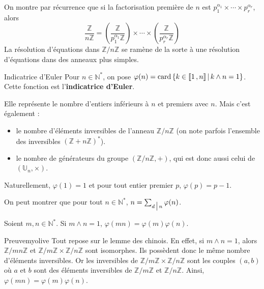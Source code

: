     On montre par récurrence que si la factorisation première de $n$ est $p_1^{\alpha_1} \times \cdots \times p_r^{\alpha_r}$, alors 
    \[ \frac{\mathbb{Z}}{n \mathbb{Z}} = \left(\frac{\mathbb{Z}}{p_1^{\alpha_1} \mathbb{Z}}\right) \times \cdots \times \left(\frac{\mathbb{Z}}{p_r^{\alpha_r} \mathbb{Z}}\right) \]   
    La résolution d’équations dans $\mathbb{Z} / n \mathbb{Z}$ se ramène de la sorte à une résolution d’équations dans des anneaux plus simples.

    \begin{defi}{Indicatrice d’Euler}{}
        Pour $n \in \mathbb{N}^*$, on pose $\varphi(n) = \operatorname{card}\left\{k \in \left\llbracket 1 \, , n \right\rrbracket \, \middle| \, k \wedge n =1\right\}$. Cette fonction est l’\textbf{indicatrice d’Euler}.
    \end{defi}
    
    Elle représente le nombre d’entiers inférieurs à $n$ et premiers avec $n$. Mais c’est également :
    \begin{itemize}
        \item le nombre d’éléments inversibles de l’anneau $\mathbb{Z} / n \mathbb{Z}$ (on note parfois l’ensemble des inversibles $(\mathbb{Z} + n \mathbb{Z})^*$).
        \item le nombre de générateurs du groupe $(\mathbb{Z} / n \mathbb{Z},+)$, qui est donc aussi celui de $(\mathbb{U}_n,\times)$.
    \end{itemize}
    Naturellement, $\varphi(1) = 1$ et pour tout entier premier $p$, $\varphi(p) = p-1$. 
    
    On peut montrer que pour tout $n \in \mathbb{N}^*$, $n = \sum_{d \, \big| \, n} \varphi(n)$.

    \begin{prop}{}{}
        Soient $m, n \in \mathbb{N}^*$. Si $m \wedge n = 1$, $\varphi(mn) = \varphi(m) \varphi(n)$.
    \end{prop}

    \begin{demo}{Preuve}{myolive}
        Tout repose sur le lemme des chinois. En effet, si $m \wedge n = 1$, alors $\mathbb{Z} / m n \mathbb{Z}$ et $\mathbb{Z} / m \mathbb{Z} \times \mathbb{Z} / n \mathbb{Z}$ sont isomorphes. Ils possèdent donc le même nombre d’éléments inversibles. Or les inversibles de $\mathbb{Z} / m \mathbb{Z} \times \mathbb{Z} / n \mathbb{Z}$ sont les couples $(a,b)$ où $a$ et $b$ sont des éléments inversibles de $\mathbb{Z} / m \mathbb{Z}$ et $\mathbb{Z} / n \mathbb{Z}$. Ainsi, $\varphi(mn) = \varphi(m) \varphi(n)$.
    \end{demo}

